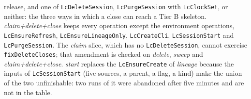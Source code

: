 \documentclass[a4paper,10pt,fleqn]{article}
\newcommand{\field}[1]{\texttt{#1}}
\begin{document}
release, and one of \field{LcDeleteSession}, \field{LcPurgeSession} with
\field{LcClockSet}, or neither: the three ways in which a close can reach a
Tier B skeleton. \emph{claim+delete+close} keeps every operation except the
environment operations, \field{LcEnsureRefresh}, \field{LcEnsureLineageOnly},
\field{LcCreateCli}, \field{LcSessionStart} and \field{LcPurgeSession}. The
\emph{claim} slice, which has no \field{LcDeleteSession}, cannot exercise
\field{fixDeleteCloses}; that amendment is checked on \emph{delete},
\emph{sweep} and \emph{claim+delete+close}. \emph{start} replaces the
\field{LcEnsureCreate} of \emph{lineage} because the inputs of
\field{LcSessionStart} (five sources, a parent, a flag, a kind) make the
union of the two unfinishable: two runs of it were abandoned after five
minutes and are not in the table.
\end{document}
